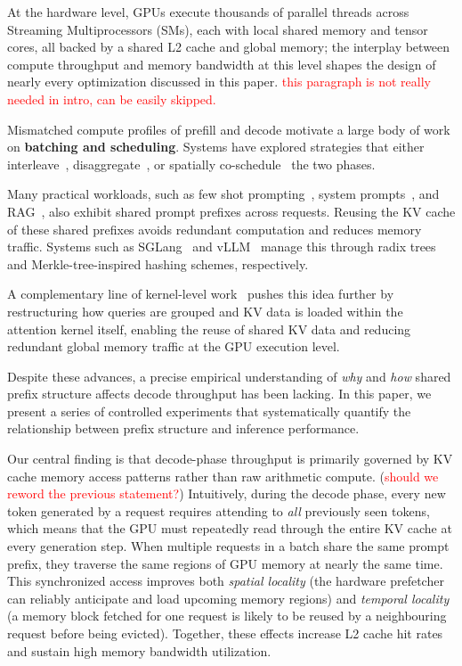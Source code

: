 At the hardware level, GPUs execute thousands of parallel threads across Streaming Multiprocessors (SMs), each with local shared memory and tensor cores, all backed by a shared L2 cache and global memory; the interplay between compute throughput and memory bandwidth at this level shapes the design of nearly every optimization discussed in this paper. \textcolor{red}{this paragraph is not really needed in intro, can be easily skipped.}

Mismatched compute profiles of prefill and decode motivate a large body of work on \textbf{batching and scheduling}. Systems have explored strategies that either  interleave~\cite{agrawal2024tamingthroughputlatencytradeoffllm}, disaggregate~\cite{zhong2024distservedisaggregatingprefilldecoding}, or spatially co-schedule~\cite{Kamath_2025,lin2025boostingllmservingspatialtemporal} the two phases. 

Many practical workloads, such as few shot prompting~\cite{brown2020languagemodelsfewshotlearners,NEURIPS2021_5c049256}, system prompts~\cite{thebigpromptlibrary}, and RAG~\cite{lewis2021retrievalaugmentedgenerationknowledgeintensivenlp}, also exhibit shared prompt prefixes across requests. Reusing the KV cache of these shared prefixes avoids redundant computation and reduces memory traffic. Systems such as SGLang~\cite{zheng2024sglangefficientexecutionstructured} and vLLM~\cite{kwon2023efficient} manage this through radix trees and Merkle-tree-inspired hashing schemes, respectively. 

A complementary line of kernel-level work~\cite{yi2025patacceleratingllmdecoding,yao2025deftdecodingflashtreeattention,ye2024chunkattentionefficientselfattentionprefixaware,MLSYS2025_96894468} pushes this idea further by restructuring how queries are grouped and KV data is loaded within the attention kernel itself, enabling the reuse of shared KV data and reducing redundant global memory traffic at the GPU execution level.

Despite these advances, a precise empirical understanding of \textit{why} and \textit{how} shared prefix structure affects decode throughput has been lacking. In this paper, we present a series of controlled experiments that systematically quantify the relationship between prefix structure and inference performance.

Our central finding is that decode-phase throughput is primarily governed by KV cache memory access patterns rather than raw arithmetic compute. (\textcolor{red}{should we reword the previous statement?}) Intuitively, during the decode phase, every new token generated by a request requires attending to \textit{all} previously seen tokens, which means that the GPU must repeatedly read through the entire KV cache at every generation step. When multiple requests in a batch share the same prompt prefix, they traverse the same regions of GPU memory at nearly the same time. This synchronized access improves both \textit{spatial locality} (the hardware prefetcher can reliably anticipate and load upcoming memory regions) and \textit{temporal locality} (a memory block fetched for one request is likely to be reused by a neighbouring request before being evicted). Together, these effects increase L2 cache hit rates and sustain high memory bandwidth utilization. 

